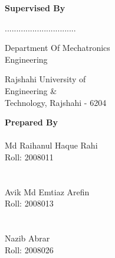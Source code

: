 \begin{center}
    \begin{multicols}{2}
        \noindent \textbf{Supervised By}


        \noindent ...............................

        \noindent Department Of Mechatronics\\
        Engineering

        \noindent Rajshahi University of\\
        Engineering \&\\
        Technology, Rajshahi - 6204

        \columnbreak

        \noindent \textbf{Prepared By}
        \noindent \makebox[6cm]{}\\
        \noindent \makebox[6cm]{\dotfill}\\

        Md Raihanul Haque Rahi\\
        Roll: 2008011\\

        \noindent \makebox[6cm]{}\\
        \noindent \makebox[6cm]{\dotfill}\\

        Avik Md Emtiaz Arefin\\
        Roll: 2008013\\

        \noindent \makebox[6cm]{}\\
        \noindent \makebox[6cm]{\dotfill}\\
        Nazib Abrar\\
        Roll: 2008026\\

    \end{multicols}
\end{center}